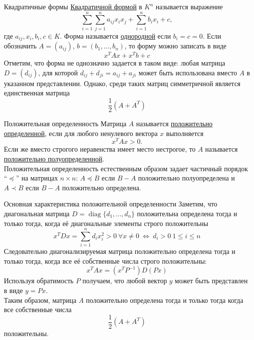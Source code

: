 \documentclass[10pt, handout]{beamer}
\DeclareMathOperator{\diag}{diag}
\begin{document}
\begin{frame}{Квадратичные формы}
\underline{Квадратичной формой} в $K^n$ называется выражение
$$
\sum_{i=1}^n\sum_{j=1}^n a_{ij}x_ix_j+\sum_{i=1}^nb_ix_i+c,
$$
где $a_{ij}, x_i, b_i, c\in K$. Форма называется \underline{однородной} если $b_i=c=0$. Если обозначить $A=(a_{ij})$, $b=(b_1, \ldots, b_n)$, то форму можно записать в виде
$$
x^TAx+x^Tb+c
$$
\pause
Отметим, что форма не однозначно задается в таком виде: любая матрица $D=(d_{ij})$, для которой $d_{ij}+d_{ji}=a_{ij}+a_{ji}$ может быть использована вместо $A$ в указанном представлении. Однако, среди таких матриц симметричной является единственная матрица
$$
\frac{1}{2}(A+A^T)
$$
\end{frame}

\begin{frame}{Положительная определенность}
Матрица $A$ называется \underline{положительно определенной}, если для любого ненулевого вектора $x$ выполняется
$$
x^TAx>0.
$$
\pause
Если же вместо строгого неравенства имеет место нестрогое, то $A$ называется \underline{положительно полуопределенной}.\\
\pause
\vspace{1em}
Положительная определенность естественным образом задает частичный порядок ``$\preceq$'' на матрицах $n\times n$: $A\preceq B$ если $B-A$ положительно полуопределена и $A\prec B$ если $B-A$ положительно определена.
\end{frame}

\begin{frame}{Основная характеристика положительной определенности}
Заметим, что диагональная матрица $D=\diag\{d_1, \ldots, d_n\}$ положительна определена тогда и только тогда, когда её диагональные элементы строго положительны
$$
x^TDx=\sum_{i=1}^nd_ix^2_i>0~\forall x\neq 0~\Leftrightarrow~d_i>0~1\leq i\leq n
$$
\pause
Следовательно диагонализируемая матрица положительно определена тогда и только тогда, когда все её собственные числа строго положительны:
$$
x^TAx=(x^TP^{-1})D(Px)
$$
Используя обратимость $P$ получаем, что любой вектор $y$ может быть представлен в виде $y=Px$.\\
\pause
Таким образом, матрица $A$ положительно определена тогда и только тогда когда все собственные числа
$$
\frac{1}{2}(A+A^T)
$$
положительны.

\end{frame}
\end{document}

